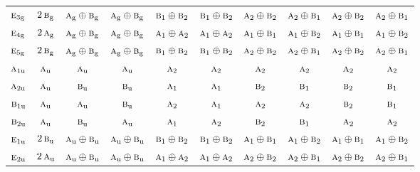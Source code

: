 \documentclass[10pt,a4paper]{article}
\numberwithin{equation}{section}
\newcommand{\irr}[1]{\text{\normalfont\scshape #1}}
\newcommand{\ptag}[1]{\mathrm{#1}}
\begin{document}
{\begin{longtable}{@{}lccccccccc@{}}
$\irr{e}_{3\ptag{g}}$ & $2\,\irr{b}_{\ptag{g}}$ & $\irr{a}_{\ptag{g}}\oplus \irr{b}_{\ptag{g}}$ & $\irr{a}_{\ptag{g}}\oplus \irr{b}_{\ptag{g}}$ & $\irr{b}_{1}\oplus \irr{b}_{2}$ & $\irr{b}_{1}\oplus \irr{b}_{2}$ & $\irr{a}_{2}\oplus \irr{b}_{2}$ & $\irr{a}_{2}\oplus \irr{b}_{1}$ & $\irr{a}_{2}\oplus \irr{b}_{2}$ & $\irr{a}_{2}\oplus \irr{b}_{1}$\\
$\irr{e}_{4\ptag{g}}$ & $2\,\irr{a}_{\ptag{g}}$ & $\irr{a}_{\ptag{g}}\oplus \irr{b}_{\ptag{g}}$ & $\irr{a}_{\ptag{g}}\oplus \irr{b}_{\ptag{g}}$ & $\irr{a}_{1}\oplus \irr{a}_{2}$ & $\irr{a}_{1}\oplus \irr{a}_{2}$ & $\irr{a}_{1}\oplus \irr{b}_{1}$ & $\irr{a}_{1}\oplus \irr{b}_{2}$ & $\irr{a}_{1}\oplus \irr{b}_{1}$ & $\irr{a}_{1}\oplus \irr{b}_{2}$\\
$\irr{e}_{5\ptag{g}}$ & $2\,\irr{b}_{\ptag{g}}$ & $\irr{a}_{\ptag{g}}\oplus \irr{b}_{\ptag{g}}$ & $\irr{a}_{\ptag{g}}\oplus \irr{b}_{\ptag{g}}$ & $\irr{b}_{1}\oplus \irr{b}_{2}$ & $\irr{b}_{1}\oplus \irr{b}_{2}$ & $\irr{a}_{2}\oplus \irr{b}_{2}$ & $\irr{a}_{2}\oplus \irr{b}_{1}$ & $\irr{a}_{2}\oplus \irr{b}_{2}$ & $\irr{a}_{2}\oplus \irr{b}_{1}$\\
$\irr{a}_{1\ptag{u}}$ & $\irr{a}_{\ptag{u}}$ & $\irr{a}_{\ptag{u}}$ & $\irr{a}_{\ptag{u}}$ & $\irr{a}_{2}$ & $\irr{a}_{2}$ & $\irr{a}_{2}$ & $\irr{a}_{2}$ & $\irr{a}_{2}$ & $\irr{a}_{2}$\\
$\irr{a}_{2\ptag{u}}$ & $\irr{a}_{\ptag{u}}$ & $\irr{b}_{\ptag{u}}$ & $\irr{b}_{\ptag{u}}$ & $\irr{a}_{1}$ & $\irr{a}_{1}$ & $\irr{b}_{2}$ & $\irr{b}_{1}$ & $\irr{b}_{2}$ & $\irr{b}_{1}$\\
$\irr{b}_{1\ptag{u}}$ & $\irr{a}_{\ptag{u}}$ & $\irr{a}_{\ptag{u}}$ & $\irr{b}_{\ptag{u}}$ & $\irr{a}_{2}$ & $\irr{a}_{1}$ & $\irr{a}_{2}$ & $\irr{a}_{2}$ & $\irr{b}_{2}$ & $\irr{b}_{1}$\\
$\irr{b}_{2\ptag{u}}$ & $\irr{a}_{\ptag{u}}$ & $\irr{b}_{\ptag{u}}$ & $\irr{a}_{\ptag{u}}$ & $\irr{a}_{1}$ & $\irr{a}_{2}$ & $\irr{b}_{2}$ & $\irr{b}_{1}$ & $\irr{a}_{2}$ & $\irr{a}_{2}$\\
$\irr{e}_{1\ptag{u}}$ & $2\,\irr{b}_{\ptag{u}}$ & $\irr{a}_{\ptag{u}}\oplus \irr{b}_{\ptag{u}}$ & $\irr{a}_{\ptag{u}}\oplus \irr{b}_{\ptag{u}}$ & $\irr{b}_{1}\oplus \irr{b}_{2}$ & $\irr{b}_{1}\oplus \irr{b}_{2}$ & $\irr{a}_{1}\oplus \irr{b}_{1}$ & $\irr{a}_{1}\oplus \irr{b}_{2}$ & $\irr{a}_{1}\oplus \irr{b}_{1}$ & $\irr{a}_{1}\oplus \irr{b}_{2}$\\
$\irr{e}_{2\ptag{u}}$ & $2\,\irr{a}_{\ptag{u}}$ & $\irr{a}_{\ptag{u}}\oplus \irr{b}_{\ptag{u}}$ & $\irr{a}_{\ptag{u}}\oplus \irr{b}_{\ptag{u}}$ & $\irr{a}_{1}\oplus \irr{a}_{2}$ & $\irr{a}_{1}\oplus \irr{a}_{2}$ & $\irr{a}_{2}\oplus \irr{b}_{2}$ & $\irr{a}_{2}\oplus \irr{b}_{1}$ & $\irr{a}_{2}\oplus \irr{b}_{2}$ & $\irr{a}_{2}\oplus \irr{b}_{1}$\\

\end{longtable}}
\end{document}
